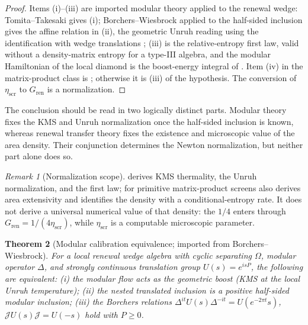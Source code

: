 \documentclass[11pt]{article}
\newtheorem{theorem}{Theorem}[section]
\theoremstyle{definition}
\theoremstyle{remark}
\newtheorem{remark}[theorem]{Remark}
\newcommand{\J}{\mathcal J}
\newcommand{\etaScr}{\eta_{\mathrm{scr}}}
\newcommand{\mods}{\Delta}
\newcommand{\Gren}{G_{\mathrm{ren}}}
\begin{document}
\begin{proof}
Items (i)--(iii) are imported modular theory applied to the renewal wedge:
Tomita--Takesaki gives (i); Borchers--Wiesbrock applied to the half-sided
inclusion gives the affine relation in (ii), the geometric Unruh reading using the
identification with wedge translations
\cite{Borchers,Wiesbrock,BisognanoWichmann}; (iii) is the relative-entropy first
law, valid without a density-matrix entropy for a type-III algebra, and the
modular Hamiltonian of the local diamond is the boost-energy integral of
\cite{CasiniHuertaMyers}.  Item (iv) in the matrix-product class is
; otherwise it is (iii) of the hypothesis.  The
conversion of $\etaScr$ to $\Gren$ is a normalization.
\end{proof}

The conclusion should be read in two logically distinct parts.  Modular theory
fixes the KMS and Unruh normalization once the half-sided inclusion is known,
whereas renewal transfer theory fixes the existence and microscopic value of the
area density.  Their conjunction determines the Newton normalization, but
neither part alone does so.

\begin{remark}[Normalization scope]
\label{rem:normalization-scope}
 derives KMS thermality, the Unruh normalization, and
the first law; for primitive matrix-product screens
 also derives area extensivity and identifies
the density with a conditional-entropy rate.  It does not derive a universal
numerical value of that density: the $1/4$ enters through $\Gren=1/(4\etaScr)$,
while $\etaScr$ is a computable microscopic parameter.
\end{remark}

\begin{theorem}[Modular calibration equivalence; imported from Borchers--Wiesbrock]
\label{thm:modular-calibration-equivalence}
For a local renewal wedge algebra with cyclic separating $\Omega$, modular
operator $\mods$, and strongly continuous translation group $U(s)=e^{isP}$, the
following are equivalent: \textup{(i)} the modular flow acts as the geometric
boost (KMS at the local Unruh temperature); \textup{(ii)} the nested translated
inclusion is a positive half-sided modular inclusion; \textup{(iii)} the Borchers
relations $\mods^{it}U(s)\mods^{-it}=U(e^{-2\pi t}s)$, $\J U(s)\J=U(-s)$ hold with
$P\ge0$.
\end{theorem}
\end{document}
